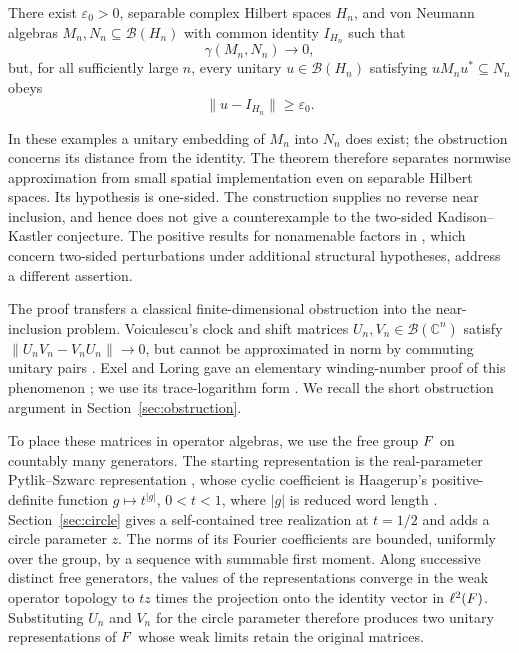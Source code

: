\begin{theorem}\label{thm:main}
There exist $\varepsilon_0>0$, separable complex Hilbert spaces $H_n$,
and von Neumann algebras $M_n,N_n\subseteq\mathcal B(H_n)$ with common
identity $I_{H_n}$ such that
\[
 \gamma(M_n,N_n)\longrightarrow 0,
\]
but, for all sufficiently large $n$, every unitary
$u\in\mathcal B(H_n)$ satisfying $uM_nu^*\subseteq N_n$ obeys
\[
 \|u-I_{H_n}\|\geq\varepsilon_0.
\]
\end{theorem}

In these examples a unitary embedding of $M_n$ into $N_n$ does exist;
the obstruction concerns its distance from the identity.  The theorem
therefore separates normwise approximation from small spatial
implementation even on separable Hilbert spaces.  Its hypothesis is
one-sided.  The construction supplies no reverse near inclusion, and
hence does not give a counterexample to the two-sided Kadison--Kastler
conjecture.  The positive results for nonamenable factors in
\cite{CCSSWW2012}, which concern two-sided perturbations under additional
structural hypotheses, address a different assertion.

The proof transfers a classical finite-dimensional obstruction into the
near-inclusion problem.  Voiculescu's clock and shift matrices
$U_n,V_n\in\mathcal B(\mathbb C^n)$ satisfy
$\|U_nV_n-V_nU_n\|\to0$, but cannot be approximated in norm by commuting
unitary pairs \cite{Voi1983}.  Exel and Loring gave an elementary
winding-number proof of this phenomenon \cite{EL1989}; we use its trace-logarithm form
\cite[Lemma~3.1]{Exel1993}.  We recall the short obstruction argument
in Section~\ref{sec:obstruction}.

To place these matrices in operator algebras, we use the free group
$F$ on countably many generators.  The starting representation
is the real-parameter Pytlik--Szwarc representation
\cite[\S2.3, Equation~(5)]{PS1986}, whose cyclic coefficient is Haagerup's
positive-definite function $g\mapsto t^{|g|}$, $0<t<1$, where $|g|$ is
reduced word length \cite[Lemma~1.2]{Haa1979}.
Section~\ref{sec:circle} gives a self-contained
tree realization at $t=1/2$ and adds a circle parameter $z$.
The norms of its Fourier coefficients are bounded, uniformly over the
group, by a sequence with summable first moment.  Along successive
distinct free generators, the values of the representations converge
in the weak operator topology to $tz$ times the projection onto the
identity vector in $\ell^2(F)$.  Substituting $U_n$ and $V_n$ for the
circle parameter therefore produces two unitary representations of
$F$ whose weak limits retain the original matrices.

